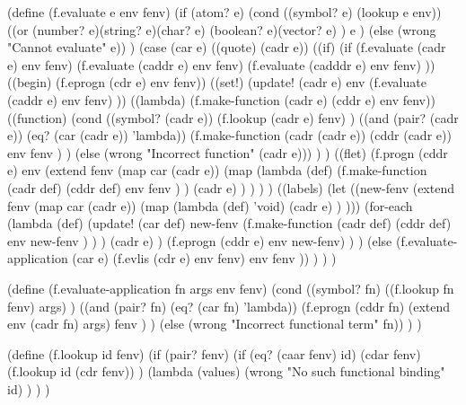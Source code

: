 \begin{code:lisp}
(define (f.evaluate e env fenv)
  (if (atom? e)
      (cond ((symbol? e) (lookup e env))
            ((or (number? e)(string? e)(char? e)
                 (boolean? e)(vector? e) )
             e )
            (else (wrong "Cannot evaluate" e)) )
      (case (car e)
        ((quote)  (cadr e))
        ((if)     (if (f.evaluate (cadr e) env fenv)
                      (f.evaluate (caddr e) env fenv)
                      (f.evaluate (cadddr e) env fenv) ))
        ((begin)  (f.eprogn (cdr e) env fenv))
        ((set!)   (update! (cadr e)
                           env
                           (f.evaluate (caddr e) env fenv) ))
        ((lambda) (f.make-function (cadr e) (cddr e) env fenv))
        ((function)
         (cond ((symbol? (cadr e))
                (f.lookup (cadr e) fenv) )
               ((and (pair? (cadr e)) (eq? (car (cadr e)) 'lambda))
                (f.make-function
                 (cadr (cadr e)) (cddr (cadr e)) env fenv ) )
               (else (wrong "Incorrect function" (cadr e))) ) )
        ((flet)
         (f.progn (cddr e)
                  env
                  (extend fenv (map car (cadr e))
                          (map (lambda (def)
                                 (f.make-function (cadr def)
                                                  (cddr def)
                                                  env fenv ) )
                               (cadr e) ) ) ) )
        ((labels)
         (let ((new-fenv (extend fenv
                                 (map car (cadr e))
                                 (map (lambda (def) 'void)
                                      (cadr e) ) )))
           (for-each (lambda (def)
                       (update! (car def)
                                new-fenv
                                (f.make-function (cadr def) (cddr def)
                                                 env new-fenv ) ) )
                     (cadr e) )
           (f.eprogn (cddr e) env new-fenv) ) )
        (else (f.evaluate-application (car e)
                                      (f.evlis (cdr e) env fenv)
                                      env
                                      fenv )) ) ) )

(define (f.evaluate-application fn args env fenv)
  (cond ((symbol? fn)
         ((f.lookup fn fenv) args) )
        ((and (pair? fn) (eq? (car fn) 'lambda))
         (f.eprogn (cddr fn)
                   (extend env (cadr fn) args)
                   fenv ) )
        (else (wrong "Incorrect functional term" fn)) ) )

(define (f.lookup id fenv)
  (if (pair? fenv)
      (if (eq? (caar fenv) id)
          (cdar fenv)
          (f.lookup id (cdr fenv)) )
      (lambda (values)
        (wrong "No such functional binding" id) ) ) )
\end{code:lisp}

